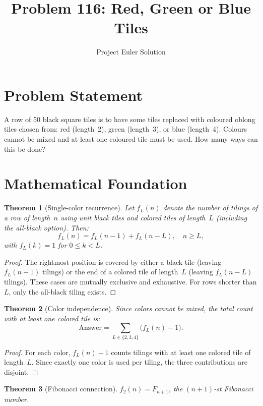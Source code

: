 \documentclass[12pt]{article}
\title{Problem 116: Red, Green or Blue Tiles}
\author{Project Euler Solution}
\date{}
\newtheorem{theorem}{Theorem}
\begin{document}
\maketitle

\section{Problem Statement}

A row of 50 black square tiles is to have some tiles replaced with coloured oblong tiles chosen from: red (length~2), green (length~3), or blue (length~4). Colours cannot be mixed and at least one coloured tile must be used. How many ways can this be done?

\section{Mathematical Foundation}

\begin{theorem}[Single-color recurrence]
Let $f_L(n)$ denote the number of tilings of a row of length~$n$ using unit black tiles and colored tiles of length~$L$ (including the all-black option). Then:
\[
f_L(n) = f_L(n-1) + f_L(n-L), \quad n \ge L,
\]
with $f_L(k) = 1$ for $0 \le k < L$.
\end{theorem}

\begin{proof}
The rightmost position is covered by either a black tile (leaving $f_L(n-1)$ tilings) or the end of a colored tile of length~$L$ (leaving $f_L(n-L)$ tilings). These cases are mutually exclusive and exhaustive. For rows shorter than $L$, only the all-black tiling exists.
\end{proof}

\begin{theorem}[Color independence]
Since colors cannot be mixed, the total count with at least one colored tile is:
\[
\text{Answer} = \sum_{L \in \{2,3,4\}} \bigl(f_L(n) - 1\bigr).
\]
\end{theorem}

\begin{proof}
For each color, $f_L(n) - 1$ counts tilings with at least one colored tile of length~$L$. Since exactly one color is used per tiling, the three contributions are disjoint.
\end{proof}

\begin{theorem}[Fibonacci connection]
$f_2(n) = F_{n+1}$, the $(n+1)$-st Fibonacci number.
\end{theorem}
\end{document}

